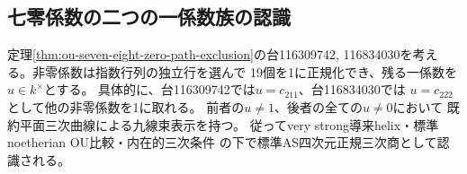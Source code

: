 \subsection{七零係数の二つの一係数族の認識}
\label{subsec:ou-seven-zero-curves}

\begin{proposition}[七零係数の滑らかな切断と節点切断]
\label{prop:ou-seven-zero-curve-recognition}
定理\ref{thm:ou-seven-eight-zero-path-exclusion}の台116309742,
116834030を考える。非零係数は指数行列の独立行を選んで
19個を1に正規化でき、残る一係数を$u\in k^\times$とする。
具体的に、台116309742では$u=c_{211}$、台116834030では
$u=c_{222}$として他の非零係数を1に取れる。
前者の$u\ne1$、後者の全ての$u\ne0$において
既約平面三次曲線による九線束表示を持つ。
従ってvery strong導来helix・標準noetherian OU比較・内在的三次条件
の下で標準AS四次元正規三次商として認識される。
\end{proposition}
